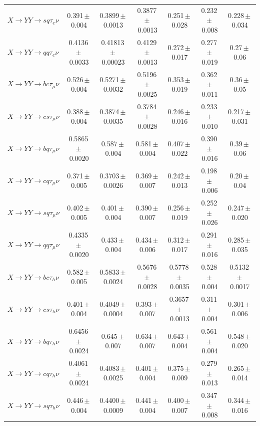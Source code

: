 \begin{landscape}
{\begin{longtable}{@{\extracolsep{\fill}}lcccccc@{}}
$X\to YY\to sq\tau_e\nu$ & 0.391\,$\pm$\,0.004 & 0.3899\,$\pm$\,0.0013 & 0.3877\,$\pm$\,0.0013 & 0.251\,$\pm$\,0.028 & 0.232\,$\pm$\,0.008 & 0.228\,$\pm$\,0.034 \\
$X\to YY\to qq\tau_e\nu$ & 0.4136\,$\pm$\,0.0033 & 0.41813\,$\pm$\,0.00023 & 0.4129\,$\pm$\,0.0013 & 0.272\,$\pm$\,0.017 & 0.277\,$\pm$\,0.019 & 0.27\,$\pm$\,0.06 \\
$X\to YY\to bc\tau_\mu\nu$ & 0.526\,$\pm$\,0.004 & 0.5271\,$\pm$\,0.0032 & 0.5196\,$\pm$\,0.0025 & 0.353\,$\pm$\,0.019 & 0.362\,$\pm$\,0.011 & 0.36\,$\pm$\,0.05 \\
$X\to YY\to cs\tau_\mu\nu$ & 0.388\,$\pm$\,0.004 & 0.3874\,$\pm$\,0.0035 & 0.3784\,$\pm$\,0.0028 & 0.246\,$\pm$\,0.016 & 0.233\,$\pm$\,0.010 & 0.217\,$\pm$\,0.031 \\
$X\to YY\to bq\tau_\mu\nu$ & 0.5865\,$\pm$\,0.0020 & 0.587\,$\pm$\,0.004 & 0.581\,$\pm$\,0.004 & 0.407\,$\pm$\,0.022 & 0.390\,$\pm$\,0.016 & 0.39\,$\pm$\,0.06 \\
$X\to YY\to cq\tau_\mu\nu$ & 0.371\,$\pm$\,0.005 & 0.3703\,$\pm$\,0.0026 & 0.369\,$\pm$\,0.007 & 0.242\,$\pm$\,0.013 & 0.198\,$\pm$\,0.006 & 0.20\,$\pm$\,0.04 \\
$X\to YY\to sq\tau_\mu\nu$ & 0.402\,$\pm$\,0.005 & 0.401\,$\pm$\,0.004 & 0.390\,$\pm$\,0.007 & 0.256\,$\pm$\,0.019 & 0.252\,$\pm$\,0.026 & 0.247\,$\pm$\,0.020 \\
$X\to YY\to qq\tau_\mu\nu$ & 0.4335\,$\pm$\,0.0020 & 0.433\,$\pm$\,0.004 & 0.434\,$\pm$\,0.006 & 0.312\,$\pm$\,0.017 & 0.291\,$\pm$\,0.016 & 0.285\,$\pm$\,0.035 \\
\midrule
$X\to YY\to bc\tau_h\nu$ & 0.582\,$\pm$\,0.005 & 0.5833\,$\pm$\,0.0024 & 0.5676\,$\pm$\,0.0028 & 0.5778\,$\pm$\,0.0035 & 0.528\,$\pm$\,0.004 & 0.5132\,$\pm$\,0.0017 \\
$X\to YY\to cs\tau_h\nu$ & 0.401\,$\pm$\,0.004 & 0.4049\,$\pm$\,0.0004 & 0.393\,$\pm$\,0.007 & 0.3657\,$\pm$\,0.0013 & 0.311\,$\pm$\,0.004 & 0.301\,$\pm$\,0.006 \\
$X\to YY\to bq\tau_h\nu$ & 0.6456\,$\pm$\,0.0024 & 0.645\,$\pm$\,0.007 & 0.634\,$\pm$\,0.007 & 0.643\,$\pm$\,0.004 & 0.561\,$\pm$\,0.004 & 0.548\,$\pm$\,0.020 \\
$X\to YY\to cq\tau_h\nu$ & 0.4061\,$\pm$\,0.0024 & 0.4083\,$\pm$\,0.0025 & 0.401\,$\pm$\,0.004 & 0.375\,$\pm$\,0.009 & 0.279\,$\pm$\,0.013 & 0.265\,$\pm$\,0.014 \\
$X\to YY\to sq\tau_h\nu$ & 0.446\,$\pm$\,0.004 & 0.4400\,$\pm$\,0.0009 & 0.441\,$\pm$\,0.004 & 0.400\,$\pm$\,0.007 & 0.347\,$\pm$\,0.008 & 0.344\,$\pm$\,0.016 \\

\end{longtable}}
\end{landscape}

